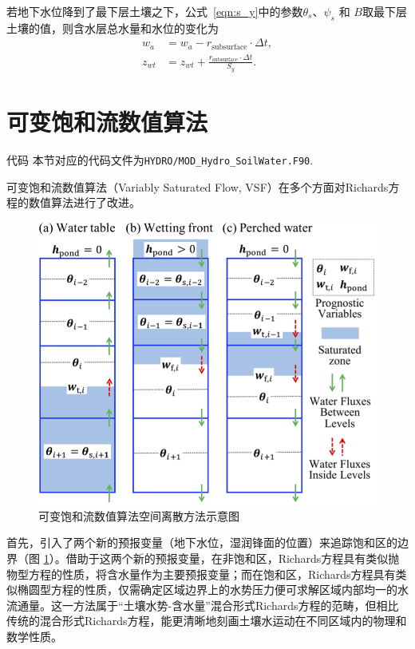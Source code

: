 若地下水位降到了最下层土壤之下，公式~\eqref{eqn:s_y}中的参数$\theta_s$、$\psi_s$ 和 $B$取最下层土壤的值，则含水层总水量和水位的变化为
\begin{equation}
\begin{aligned}
    w_{a} & = w_{a} - r_{\mathrm{subsurface}} \cdot \Delta t, \\
    z_{wt} & = z_{w t}+\frac{r_{\mathrm{subsurface}} \cdot \Delta t}{S_{y}}.
\end{aligned}
\end{equation}

\section{可变饱和流数值算法}

\begin{mymdframed}{代码}
本节对应的代码文件为\texttt{HYDRO/MOD\_Hydro\_SoilWater.F90}.
\end{mymdframed}

可变饱和流数值算法（Variably Saturated Flow, VSF）\citep{dai2019vsf}在多个方面对Richards方程的数值算法进行了改进。

{
\begin{figure}[htbp]
\centering
\includegraphics{Figures/陆地表面的水分循环/可变饱和流数值算法预报区域空间结构示意图.png}
\caption{可变饱和流数值算法空间离散方法示意图}
\label{fig:可变饱和流数值算法预报区域空间结构示意图}
\end{figure}
}

首先，引入了两个新的预报变量（地下水位，湿润锋面的位置）来追踪饱和区的边界（图 \ref{fig:可变饱和流数值算法预报区域空间结构示意图}）。借助于这两个新的预报变量，在非饱和区，Richards方程具有类似抛物型方程的性质，将含水量作为主要预报变量；而在饱和区，Richards方程具有类似椭圆型方程的性质，仅需确定区域边界上的水势压力便可求解区域内部均一的水流通量。这一方法属于“土壤水势-含水量”混合形式Richards方程的范畴，但相比传统的混合形式Richards方程，能更清晰地刻画土壤水运动在不同区域内的物理和数学性质。

